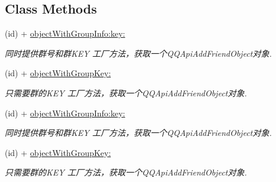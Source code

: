\subsection*{Class Methods}
\begin{DoxyCompactItemize}
\item 
\mbox{\label{interface_q_q_api_join_group_object_aeee744ce2528820624e171eb8efa4c78}} 
(id) + \mbox{\hyperlink{interface_q_q_api_join_group_object_aeee744ce2528820624e171eb8efa4c78}{object\+With\+Group\+Info\+:key\+:}}
\begin{DoxyCompactList}\small\item\em 同时提供群号和群\+K\+EY 工厂方法，获取一个\+Q\+Q\+Api\+Add\+Friend\+Object对象. \end{DoxyCompactList}\item 
\mbox{\label{interface_q_q_api_join_group_object_a86b8ed9df9a160a37575081ea2f4039b}} 
(id) + \mbox{\hyperlink{interface_q_q_api_join_group_object_a86b8ed9df9a160a37575081ea2f4039b}{object\+With\+Group\+Key\+:}}
\begin{DoxyCompactList}\small\item\em 只需要群的\+K\+EY 工厂方法，获取一个\+Q\+Q\+Api\+Add\+Friend\+Object对象. \end{DoxyCompactList}\item 
\mbox{\label{interface_q_q_api_join_group_object_aeee744ce2528820624e171eb8efa4c78}} 
(id) + \mbox{\hyperlink{interface_q_q_api_join_group_object_aeee744ce2528820624e171eb8efa4c78}{object\+With\+Group\+Info\+:key\+:}}
\begin{DoxyCompactList}\small\item\em 同时提供群号和群\+K\+EY 工厂方法，获取一个\+Q\+Q\+Api\+Add\+Friend\+Object对象. \end{DoxyCompactList}\item 
\mbox{\label{interface_q_q_api_join_group_object_a86b8ed9df9a160a37575081ea2f4039b}} 
(id) + \mbox{\hyperlink{interface_q_q_api_join_group_object_a86b8ed9df9a160a37575081ea2f4039b}{object\+With\+Group\+Key\+:}}
\begin{DoxyCompactList}\small\item\em 只需要群的\+K\+EY 工厂方法，获取一个\+Q\+Q\+Api\+Add\+Friend\+Object对象. \end{DoxyCompactList}\end{DoxyCompactItemize}
